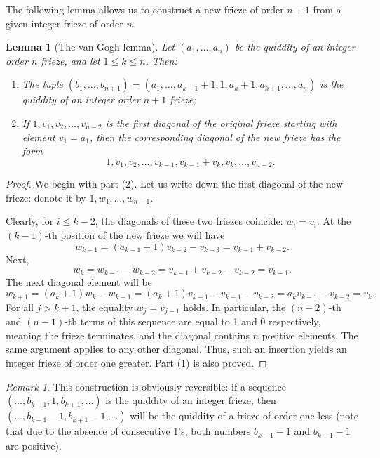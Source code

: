 \documentclass[a4paper,11pt]{amsart}
\theoremstyle{plain}
\newtheorem{lemma}[theorem]{Lemma}
\theoremstyle{remark}
\newtheorem{remark}[theorem]{Remark}
\theoremstyle{definition}
\numberwithin{equation}{section}
\numberwithin{figure}{section}
\begin{document}
The following lemma allows us to construct a new frieze of order $n+1$ from a given integer  frieze of order $n$.

\begin{lemma}[The van Gogh lemma]\label{lem:vangogh}
Let $(a_1,\dots,a_n)$ be the quiddity of an integer order $n$ frieze, and let $1 \leq k \leq n$. Then:

\begin{enumerate}
    \item The tuple $(b_1,\dots,b_{n+1}) = (a_1,\dots,a_{k-1}+1,1,a_k+1,a_{k+1},\dots,a_n)$ is the quiddity of an integer order $n+1$ frieze;
    \item If $1,v_1,v_2,\dots,v_{n-2}$ is the first diagonal of the original frieze starting with element \mbox{$v_1 = a_1$}, then the corresponding diagonal of the new frieze has the form
\[
1,v_1,v_2,\dots,v_{k-1},v_{k-1}+v_k,v_k,\dots,v_{n-2}.
\]
\end{enumerate}
\end{lemma}

\begin{proof}
We begin with part (2). Let us write down the first diagonal of the new frieze: denote it by $1,w_1,\dots,w_{n-1}$.

Clearly, for $i \leq k-2$, the diagonals of these two friezes coincide: $w_i = v_i$. At the $(k-1)$-th position of the new frieze we will have
\[
w_{k-1} = (a_{k-1}+1)v_{k-2} - v_{k-3} = v_{k-1} + v_{k-2}.
\]
Next,
\[
w_k = w_{k-1} - w_{k-2} = v_{k-1} + v_{k-2} - v_{k-2} = v_{k-1}.
\]
The next diagonal element will be
\[
w_{k+1} = (a_k+1)w_k - w_{k-1} = (a_k+1)v_{k-1} - v_{k-1} - v_{k-2} = a_k v_{k-1} - v_{k-2} = v_k.
\]
For all $j > k+1$, the equality $w_j = v_{j-1}$ holds. In particular, the $(n-2)$-th and $(n-1)$-th terms of this sequence are equal to 1 and 0 respectively, meaning the frieze terminates, and the diagonal contains $n$ positive elements. The same argument applies to any other diagonal. Thus, such an insertion yields an integer frieze of order one greater. Part (1) is also proved.
\end{proof}

\begin{remark}\label{rem:vangogh}
This construction is obviously reversible: if a sequence $(\dots,b_{k-1},1,b_{k+1},\dots)$ is the quiddity of an integer frieze, then $(\dots,b_{k-1}-1,b_{k+1}-1,\dots)$ will be the quiddity of a frieze of order one less (note that due to the absence of consecutive 1's, both numbers $b_{k-1}-1$ and $b_{k+1}-1$ are positive).
\end{remark}
\end{document}

